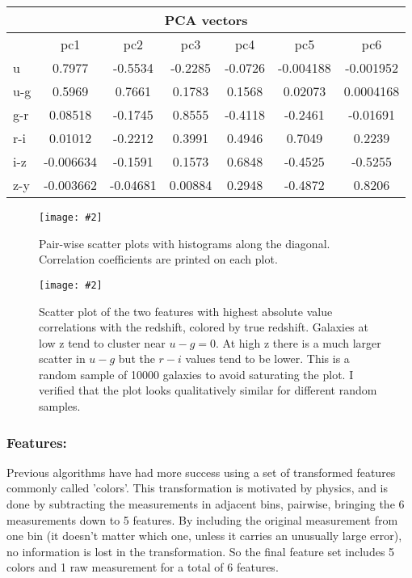 \documentclass[13pt]{amsart}
\newcommand{\figscale}[4]{
\begin{figure}[ht]
    \centering
    \caption{#3}
    \label{#4}
    \texttt{[image: \#2]}
\end{figure}
}
\begin{document}
    \begin{center}
    \begin{tabular}{|l|c|c|c|c|c|c|}
      \multicolumn{7}{c}{PCA vectors} \\ \hline
      & pc1 & pc2 & pc3 & pc4 & pc5 & pc6 \\ \hline
      u &  0.7977 & -0.5534 & -0.2285 & -0.0726 & -0.004188 & -0.001952 \\ \hline
      u-g &  0.5969 & 0.7661 & 0.1783 & 0.1568 & 0.02073 & 0.0004168 \\ \hline
      g-r &  0.08518 & -0.1745 & 0.8555 & -0.4118 & -0.2461 & -0.01691 \\ \hline
      r-i &  0.01012 & -0.2212 & 0.3991 & 0.4946 & 0.7049 & 0.2239 \\ \hline
      i-z &  -0.006634 & -0.1591 & 0.1573 & 0.6848 & -0.4525 & -0.5255 \\ \hline
      z-y &  -0.003662 & -0.04681 & 0.00884 & 0.2948 & -0.4872 & 0.8206 \\ \hline
    \end{tabular}
    \end{center}

    \figscale{1}{../data/corrplot.png}{Pair-wise scatter plots with histograms along the diagonal. Correlation coefficients are printed on each plot.}{fig:corrplot}

    \figscale{1}{../data/top2features_coloredby_z.png}{Scatter plot of the two features with highest absolute value correlations with the redshift, colored by true redshift. Galaxies at low z tend to cluster near $u-g=0$. At high z there is a much larger scatter in $u-g$ but the $r-i$ values tend to be lower. This is a random sample of 10000 galaxies to avoid saturating the plot. I verified that the plot looks qualitatively similar for different random samples.}{fig:topfeatures}



    \subsubsection{Features:}

      Previous algorithms have had more success using a set of transformed features commonly called 'colors'. This transformation is motivated by physics, and is done by subtracting the measurements in adjacent bins, pairwise, bringing the 6 measurements down to 5 features. By including the original measurement from one bin (it doesn't matter which one, unless it carries an unusually large error), no information is lost in the transformation. So the final feature set includes 5 colors and 1 raw measurement for a total of 6 features.
\end{document}
